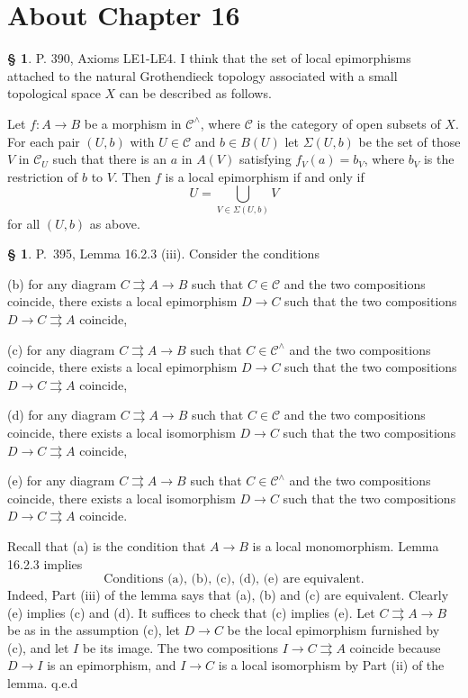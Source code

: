 \documentclass[12pt]{article}
\theoremstyle{remark}
\theoremstyle{definition}
\newtheorem{s}[thm]{\S}
\newcommand{\C}{\mathcal C}
\newcommand{\parar}{\rightrightarrows}
\begin{document}
\section{About Chapter 16}
%
%
\begin{s} 
P. 390, Axioms LE1-LE4. I think that the set of local epimorphisms attached to the natural Grothendieck topology associated with a small topological space $X$ can be described as follows. 

Let $f:A\to B$ be a morphism in $\C^\wedge$, where $\C$ is the category of open subsets of $X$. For each pair $(U,b)$ with $U\in\C$ and $b\in B(U)$ let $\Sigma(U,b)$ be the set of those $V$ in $\C_U$ such that there is an $a$ in $A(V)$ satisfying $f_V(a)=b_V$, where $b_V$ is the restriction of $b$ to $V$. Then $f$ is a local epimorphism if and only if 
$$
U=\bigcup_{V\in\Sigma(U,b)}V
$$ 
for all $(U,b)$ as above.
\end{s}
%
%
\begin{s}\label{s1623}
P.~395, Lemma 16.2.3 (iii). Consider the conditions

\noindent(b) for any diagram $C\parar A\to B$ such that $C\in\C$ and the two compositions coincide, there exists a local epimorphism $D\to C$ such that the two compositions $D\to C\parar A$ coincide,

\noindent(c) for any diagram $C\parar A\to B$ such that $C\in\C^\wedge$ and the two compositions coincide, there exists a local epimorphism $D\to C$ such that the two compositions $D\to C\parar A$ coincide,

\noindent(d) for any diagram $C\parar A\to B$ such that $C\in\C$ and the two compositions coincide, there exists a local isomorphism $D\to C$ such that the two compositions $D\to C\parar A$ coincide,

\noindent(e) for any diagram $C\parar A\to B$ such that $C\in\C^\wedge$ and the two compositions coincide, there exists a local isomorphism $D\to C$ such that the two compositions $D\to C\parar A$ coincide.

Recall that (a) is the condition that $A\to B$ is a local monomorphism. Lemma 16.2.3 implies 
%
\begin{equation}\label{e1623}
\text{Conditions (a), (b), (c), (d), (e) are equivalent.}
\end{equation}
%
Indeed, Part (iii) of the lemma says that (a), (b) and (c) are equivalent. Clearly (e) implies (c) and (d). It suffices to check that (c) implies (e). Let $C\parar A\to B$ be as in the assumption (c), let $D\to C$ be the local epimorphism furnished by (c), and let $I$ be its image. The two compositions $I\to C\parar A$ coincide because $D\to I$ is an epimorphism, and $I\to C$ is a local isomorphism by Part (ii) of the lemma. q.e.d
\end{s}
\end{document}

